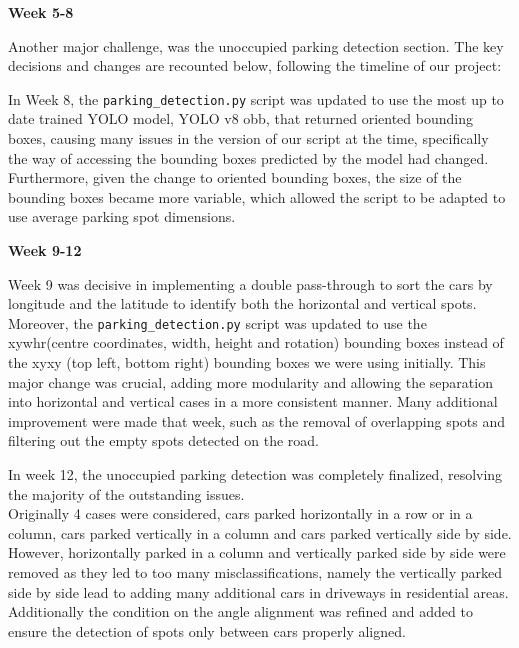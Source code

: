 \textbf{Week 5-8}

Another major challenge, was the unoccupied parking detection section. The key
decisions and changes are recounted below, following the timeline of our
project:

In Week 8, the \texttt{parking\_detection.py} script was updated to use the most
up to date trained YOLO model, YOLO v8 obb, that returned oriented bounding
boxes, causing many issues in the version of our script at the time,
specifically the way of accessing the bounding boxes predicted by the model had
changed. Furthermore, given the change to oriented bounding boxes, the size of
the bounding boxes became more variable, which allowed the script to be adapted
to use average parking spot dimensions.

\textbf{Week 9-12}

Week 9 was decisive in implementing a double pass-through to sort the cars by
longitude and the latitude to identify both the horizontal and vertical spots.
Moreover, the \texttt{parking\_detection.py} script was updated to use the
xywhr(centre coordinates, width, height and rotation) bounding boxes instead of
the xyxy (top left, bottom right)  bounding boxes we were using initially. This
major change was crucial, adding more modularity and allowing the
separation into horizontal and vertical cases in a more consistent manner.
Many additional improvement were made that week, such as the removal of
overlapping spots and filtering out the empty spots detected on the road.

In week 12, the unoccupied parking detection was completely finalized, resolving the
majority of the outstanding issues.\\
Originally 4 cases were considered, cars parked horizontally in a row or in a
column, cars parked vertically in a column and cars parked vertically side by
side. However, horizontally parked in a column and vertically parked side by side
were removed as they led to too many misclassifications, namely the vertically
parked side by side lead to adding many additional cars in driveways in
residential areas.
Additionally the condition on the angle alignment was refined and added to ensure
the detection of spots only between cars properly aligned.

